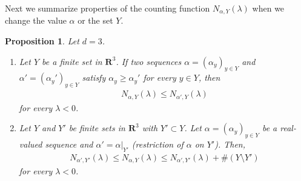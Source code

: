 \documentclass[12pt,a4paper]{article}
\newtheorem{proposition}[theorem]{Proposition}
\begin{document}
Next we summarize properties of the counting function $N_{\alpha,Y}(\lambda)$
when we change the value $\alpha$ or the set $Y$.
\begin{proposition}
Let $d=3$.
\label{prop_al2} 
\begin{enumerate}
 \item[(1)]
Let $Y$ be a finite set in $\mathbf{R}^3$.
If two sequences 
$\alpha=(\alpha_y)_{y\in Y}$
and 
$\alpha'=(\alpha_y')_{y\in Y}$
satisfy
$\alpha_y \geq \alpha_y'$ for every $y\in Y$,
then
\begin{align*}
 N_{\alpha,Y}(\lambda)\leq N_{\alpha',Y}(\lambda)
\end{align*}
for every $\lambda<0$.

 \item[(2)]
Let $Y$ and $Y'$ be finite sets in $\mathbf{R}^3$ with $Y'\subset Y$.
Let $\alpha = (\alpha_y)_{y\in Y}$ 
be a real-valued sequence
 and $\alpha' = \alpha|_{Y'}$ 
(restriction of $\alpha$ on $Y'$).
Then,
\begin{align*}
 N_{\alpha', Y'}(\lambda) \leq  N_{\alpha, Y}(\lambda)
\leq N_{\alpha', Y'}(\lambda) + \#(Y\setminus Y')
\end{align*}
for every $\lambda<0 $.
\end{enumerate}

\end{proposition}
\end{document}
